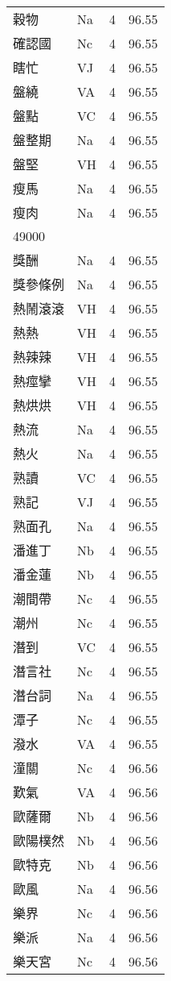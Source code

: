 \documentclass[twocolumn]{book}
\begin{document}
\begin{supertabular}{llrr}
穀物 & Na & 4 &  96.55\\
確認國 & Nc & 4 &  96.55\\
瞎忙 & VJ & 4 &  96.55\\
盤繞 & VA & 4 &  96.55\\
盤點 & VC & 4 &  96.55\\
盤整期 & Na & 4 &  96.55\\
盤堅 & VH & 4 &  96.55\\
瘦馬 & Na & 4 &  96.55\\
瘦肉 & Na & 4 &  96.55\\
49000\\
獎酬 & Na & 4 &  96.55\\
獎參條例 & Na & 4 &  96.55\\
熱鬧滾滾 & VH & 4 &  96.55\\
熱熱 & VH & 4 &  96.55\\
熱辣辣 & VH & 4 &  96.55\\
熱痙攣 & VH & 4 &  96.55\\
熱烘烘 & VH & 4 &  96.55\\
熱流 & Na & 4 &  96.55\\
熱火 & Na & 4 &  96.55\\
熟讀 & VC & 4 &  96.55\\
熟記 & VJ & 4 &  96.55\\
熟面孔 & Na & 4 &  96.55\\
潘進丁 & Nb & 4 &  96.55\\
潘金蓮 & Nb & 4 &  96.55\\
潮間帶 & Nc & 4 &  96.55\\
潮州 & Nc & 4 &  96.55\\
潛到 & VC & 4 &  96.55\\
潛言社 & Nc & 4 &  96.55\\
潛台詞 & Na & 4 &  96.55\\
潭子 & Nc & 4 &  96.55\\
潑水 & VA & 4 &  96.55\\
潼關 & Nc & 4 &  96.56\\
歎氣 & VA & 4 &  96.56\\
歐薩爾 & Nb & 4 &  96.56\\
歐陽樸然 & Nb & 4 &  96.56\\
歐特克 & Nb & 4 &  96.56\\
歐風 & Na & 4 &  96.56\\
樂界 & Nc & 4 &  96.56\\
樂派 & Na & 4 &  96.56\\
樂天宮 & Nc & 4 &  96.56\\

\end{supertabular}
\end{document}
